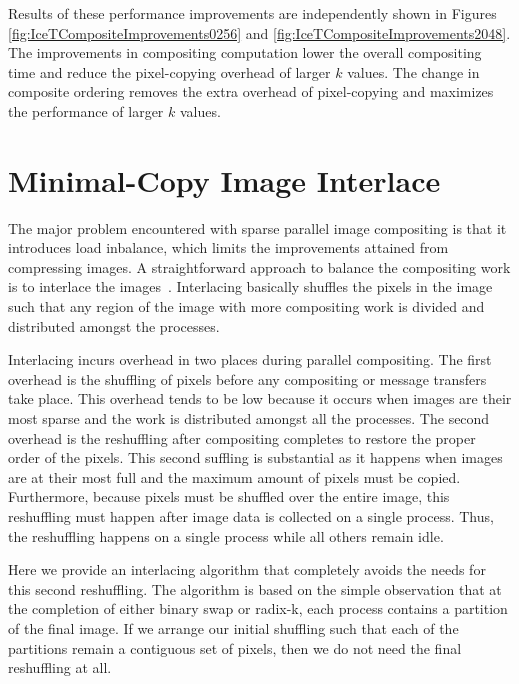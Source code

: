 \documentclass{acm_proc_article-sp}
\newcommand*{\lcite}[1]{~\cite{#1}}
\begin{document}
Results of these performance improvements are independently shown in
Figures \ref{fig:IceTCompositeImprovements0256} and
\ref{fig:IceTCompositeImprovements2048}.  The improvements in compositing
computation lower the overall compositing time and reduce the pixel-copying
overhead of larger $k$ values.  The change in composite ordering removes
the extra overhead of pixel-copying and maximizes the performance of larger
$k$ values.

\section{Minimal-Copy Image Interlace}
\label{sec:ImageInterlacing}

The major problem encountered with sparse parallel image compositing is
that it introduces load inbalance, which limits the improvements attained
from compressing images.  A straightforward approach to balance the
compositing work is to interlace the
images\lcite{Molnar1994,Takeuchi2003}.  Interlacing basically shuffles the
pixels in the image such that any region of the image with more compositing
work is divided and distributed amongst the processes.

Interlacing incurs overhead in two places during parallel compositing.  The
first overhead is the shuffling of pixels before any compositing or message
transfers take place.  This overhead tends to be low because it occurs when
images are their most sparse and the work is distributed amongst all the
processes.  The second overhead is the reshuffling after compositing
completes to restore the proper order of the pixels.  This second suffling
is substantial as it happens when images are at their most full and the
maximum amount of pixels must be copied.  Furthermore, because pixels must
be shuffled over the entire image, this reshuffling must happen after image
data is collected on a single process.  Thus, the reshuffling happens on a
single process while all others remain idle.

Here we provide an interlacing algorithm that completely avoids the needs
for this second reshuffling.  The algorithm is based on the simple
observation that at the completion of either binary swap or radix-k, each
process contains a partition of the final image.  If we arrange our initial
shuffling such that each of the partitions remain a contiguous set of
pixels, then we do not need the final reshuffling at all.
\end{document}

